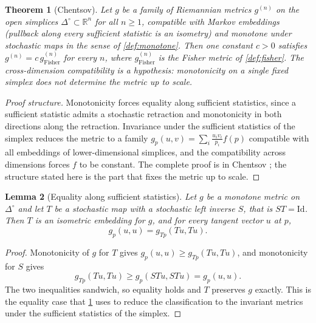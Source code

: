 \documentclass[11pt,letterpaper]{article}
\newtheorem{theorem}{Theorem}[section]
\newtheorem{lemma}[theorem]{Lemma}
\theoremstyle{definition}
\theoremstyle{remark}
\begin{document}
\begin{theorem}[Chentsov]
\label{thm:chentsov}
Let $g$ be a family of Riemannian metrics $g^{(n)}$ on the open simplices $\Delta^{\circ} \subset \mathbb{R}^{n}$ for all $n \geq 1$, compatible with Markov embeddings (pullback along every sufficient statistic is an isometry) and monotone under stochastic maps in the sense of \cref{def:monotone}. Then one constant $c > 0$ satisfies $g^{(n)} = c \, g_{\mathrm{Fisher}}^{(n)}$ for every $n$, where $g_{\mathrm{Fisher}}^{(n)}$ is the Fisher metric of \cref{def:fisher}. The cross-dimension compatibility is a hypothesis: monotonicity on a single fixed simplex does not determine the metric up to scale.
\end{theorem}

\begin{proof}[Proof structure]
Monotonicity forces equality along sufficient statistics, since a sufficient statistic admits a stochastic retraction and monotonicity in both directions along the retraction. Invariance under the sufficient statistics of the simplex reduces the metric to a family $g_p(u, v) = \sum_i \frac{u_i v_i}{p_i} f(p)$ compatible with all embeddings of lower-dimensional simplices, and the compatibility across dimensions forces $f$ to be constant. The complete proof is in Chentsov \cite{chentsov}; the structure stated here is the part that fixes the metric up to scale.
\end{proof}

\begin{lemma}[Equality along sufficient statistics]
\label{lem:sufficiency}
Let $g$ be a monotone metric on $\Delta^{\circ}$ and let $T$ be a stochastic map with a stochastic left inverse $S$, that is $S T = \mathrm{Id}$. Then $T$ is an isometric embedding for $g$, and for every tangent vector $u$ at $p$,
\[
g_{p}(u, u) = g_{Tp}(Tu, Tu).
\]
\end{lemma}

\begin{proof}
Monotonicity of $g$ for $T$ gives $g_{p}(u, u) \geq g_{Tp}(Tu, Tu)$, and monotonicity for $S$ gives
\[
g_{Tp}(Tu, Tu) \geq g_{p}(S T u, S T u) = g_{p}(u, u).
\]
The two inequalities sandwich, so equality holds and $T$ preserves $g$ exactly. This is the equality case that \cref{thm:chentsov} uses to reduce the classification to the invariant metrics under the sufficient statistics of the simplex.
\end{proof}
\end{document}
